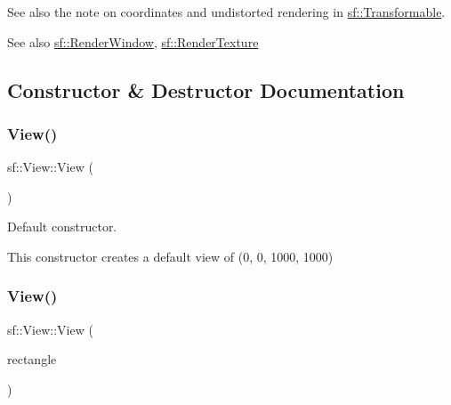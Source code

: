 See also the note on coordinates and undistorted rendering in \mbox{\hyperlink{classsf_1_1_transformable}{sf\+::\+Transformable}}.

\begin{DoxySeeAlso}{See also}
\mbox{\hyperlink{classsf_1_1_render_window}{sf\+::\+Render\+Window}}, \mbox{\hyperlink{classsf_1_1_render_texture}{sf\+::\+Render\+Texture}} \begin{DoxyVerb}\end{DoxyVerb}
 
\end{DoxySeeAlso}


\subsection{Constructor \& Destructor Documentation}
\mbox{\label{classsf_1_1_view_a28c38308ff089ae5bdacd001d12286d3}} 
\subsubsection{\texorpdfstring{View()}{View()}\hspace{0.1cm}{\footnotesize\ttfamily [1/3]}}
{\footnotesize\ttfamily sf\+::\+View\+::\+View (\begin{DoxyParamCaption}{ }\end{DoxyParamCaption})}



Default constructor. 

This constructor creates a default view of (0, 0, 1000, 1000) \begin{DoxyVerb}\end{DoxyVerb}
 \mbox{\label{classsf_1_1_view_a1d63bc49e041b3b1ff992bb6430e1326}} 
\subsubsection{\texorpdfstring{View()}{View()}\hspace{0.1cm}{\footnotesize\ttfamily [2/3]}}
{\footnotesize\ttfamily sf\+::\+View\+::\+View (\begin{DoxyParamCaption}\item[{const \mbox{\hyperlink{classsf_1_1_rect}{Float\+Rect}} \&}]{rectangle }\end{DoxyParamCaption})\hspace{0.3cm}{\ttfamily [explicit]}}



